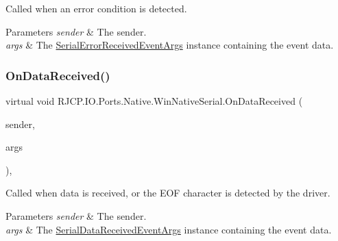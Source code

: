 Called when an error condition is detected. 


\begin{DoxyParams}{Parameters}
{\em sender} & The sender.\\
\hline
{\em args} & The \mbox{\hyperlink{class_r_j_c_p_1_1_i_o_1_1_ports_1_1_serial_error_received_event_args}{Serial\+Error\+Received\+Event\+Args}} instance containing the event data.\\
\hline
\end{DoxyParams}
\mbox{\label{class_r_j_c_p_1_1_i_o_1_1_ports_1_1_native_1_1_win_native_serial_ac927fc2e62ce46556e64761ca84c14d2}} 
\subsubsection{\texorpdfstring{OnDataReceived()}{OnDataReceived()}}
{\footnotesize\ttfamily virtual void R\+J\+C\+P.\+I\+O.\+Ports.\+Native.\+Win\+Native\+Serial.\+On\+Data\+Received (\begin{DoxyParamCaption}\item[{object}]{sender,  }\item[{\mbox{\hyperlink{class_r_j_c_p_1_1_i_o_1_1_ports_1_1_serial_data_received_event_args}{Serial\+Data\+Received\+Event\+Args}}}]{args }\end{DoxyParamCaption})\hspace{0.3cm}{\ttfamily [protected]}, {\ttfamily [virtual]}}



Called when data is received, or the E\+OF character is detected by the driver. 


\begin{DoxyParams}{Parameters}
{\em sender} & The sender.\\
\hline
{\em args} & The \mbox{\hyperlink{class_r_j_c_p_1_1_i_o_1_1_ports_1_1_serial_data_received_event_args}{Serial\+Data\+Received\+Event\+Args}} instance containing the event data.\\
\hline
\end{DoxyParams}
\mbox{\label{class_r_j_c_p_1_1_i_o_1_1_ports_1_1_native_1_1_win_native_serial_a2ab6155ff7c5c31143a3f7fba479057b}} 

